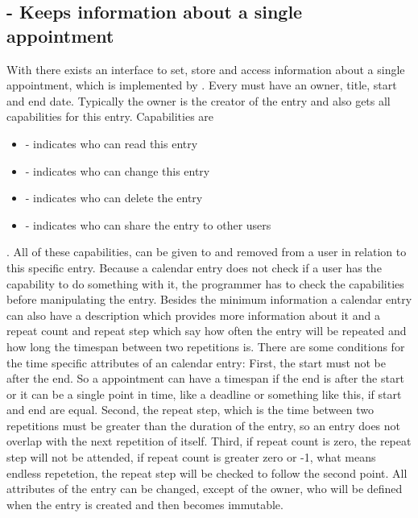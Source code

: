 \subsection{ - Keeps information about a single appointment}

With  there exists an interface to set, store and access information about a single appointment, which is implemented
by .
Every  must have an owner, title, start and end date.
Typically the owner is the creator of the entry and also gets all capabilities for this entry.
Capabilities are
\begin{itemize}
    \item {} - indicates who can read this entry
    \item {} - indicates who can change this entry
    \item {} - indicates who can delete the entry
    \item {} - indicates who can share the entry to other users
\end{itemize}.
All of these capabilities, can be given to and removed from a user in relation to this specific entry.
Because a calendar entry does not check if a user has the capability to do something with it, the programmer has to check the capabilities before manipulating the entry.
Besides the minimum information a calendar entry can also have a description which provides more information about it and a repeat count and repeat step which say how 
often the entry will be repeated and how long the timespan between two repetitions is.
There are some conditions for the time specific attributes of an calendar entry: First, the start must not be after the end. So a appointment can have a timespan if the end is after the start or it can be a single point in time, like a deadline or something like this, if start and end are equal.
Second, the repeat step, which is the time between two repetitions must be greater than the duration of the entry, so an entry does not overlap with the next repetition of itself.
Third, if repeat count is zero, the repeat step will not be attended, if repeat count is greater zero or -1, what means endless repetetion, the repeat step will be checked to follow the second point.
All attributes of the entry can be changed, except of the owner, who will be defined when the entry is created and then becomes immutable. 